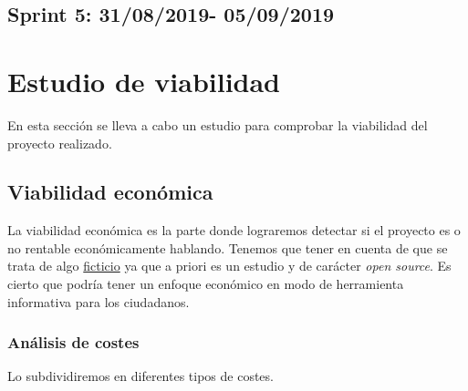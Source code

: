 \subsection{Sprint 5: 31/08/2019- 05/09/2019}\label{sprint5}


\section{Estudio de viabilidad}\label{estudio-viabilidad}
En esta sección se lleva a cabo un estudio para comprobar la viabilidad del proyecto realizado. 

\subsection{Viabilidad económica}\label{viabilidad-economica}

La viabilidad económica es la parte donde lograremos detectar si el proyecto es o no rentable económicamente hablando. Tenemos que tener en cuenta de que se trata de algo \underline{ficticio} ya que a priori es un estudio y de carácter \textit{open source}. Es cierto que podría tener un enfoque económico en modo de herramienta informativa para los ciudadanos.

\subsubsection{Análisis de costes}\label{costes}

Lo subdividiremos en diferentes tipos de costes.

